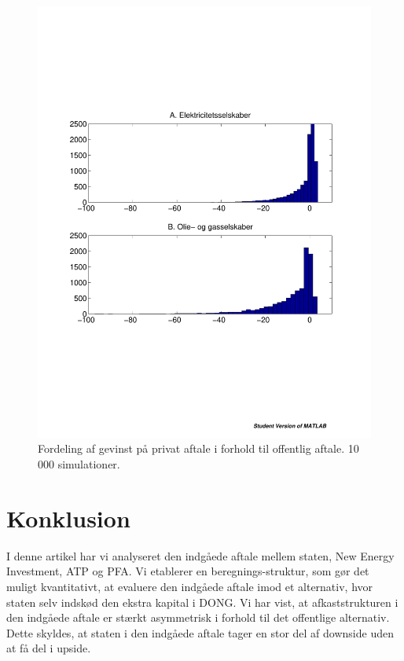 \documentclass{article}
\begin{document}
\begin{figure}
\includegraphics[scale=0.8]{../matlab/figs/sim_return.pdf}
\caption{Fordeling af gevinst på privat aftale i forhold til offentlig aftale. 10 000 simulationer. }
\label{fig:sim}
\end{figure}

\FloatBarrier

\section{Konklusion}

I denne artikel har vi analyseret den indgåede aftale mellem staten, New Energy Investment, ATP og PFA. Vi etablerer en beregnings-struktur, som gør det muligt kvantitativt, at evaluere den indgåede aftale imod et alternativ, hvor staten selv indskød den ekstra kapital i DONG. Vi har vist, at afkaststrukturen i den indgåede aftale er stærkt asymmetrisk i forhold til det offentlige alternativ. Dette skyldes, at staten i den indgåede aftale tager en stor del af downside uden at få del i upside. 
\end{document}
